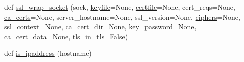 \begin{DoxyCompactItemize}
def \hyperlink{namespacepip_1_1__vendor_1_1urllib3_1_1util_1_1ssl___a9710b3d29237b22c827c4738493c77af}{ssl\+\_\+wrap\+\_\+socket} (sock, \hyperlink{namespacepip_1_1__vendor_1_1urllib3_1_1util_1_1ssl___a63fac30b281feb3808f4aaf098f65de9}{keyfile}=None, \hyperlink{namespacepip_1_1__vendor_1_1urllib3_1_1util_1_1ssl___aca2995b84eedf111317e97c91e894ef5}{certfile}=None, cert\+\_\+reqs=None, \hyperlink{namespacepip_1_1__vendor_1_1urllib3_1_1util_1_1ssl___a5a09a7c6d1225b5516ad299dfcbb4476}{ca\+\_\+certs}=None, server\+\_\+hostname=None, ssl\+\_\+version=None, \hyperlink{namespacepip_1_1__vendor_1_1urllib3_1_1util_1_1ssl___a8cf96bb5b5358ce52fc3624e2cd048d3}{ciphers}=None, ssl\+\_\+context=None, ca\+\_\+cert\+\_\+dir=None, key\+\_\+password=None, ca\+\_\+cert\+\_\+data=None, tls\+\_\+in\+\_\+tls=False)
\item 
def \hyperlink{namespacepip_1_1__vendor_1_1urllib3_1_1util_1_1ssl___a24009fbf006a446a999c0b2d18a1f8ad}{is\+\_\+ipaddress} (hostname)
\end{DoxyCompactItemize}
